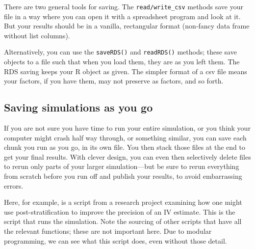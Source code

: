 \documentclass[
]{book}
\begin{document}
There are two general tools for saving. The \texttt{read/write\_csv} methods save your file in a way where you can open it with a spreadsheet program and look at it.
But your results should be in a vanilla, rectangular format (non-fancy data frame without list columns).

Alternatively, you can use the \texttt{saveRDS()} and \texttt{readRDS()} methods; these save objects to a file such that when you load them, they are as you left them.
The RDS saving keeps your R object as given.
The simpler format of a csv file means your factors, if you have them, may not preserve as factors, and so forth.

\subsection{Saving simulations as you go}\label{saving-simulations-as-you-go}

If you are not sure you have time to run your entire simulation, or you think your computer might crash half way through, or something similar, you can save each chunk you run as you go, in its own file. You then stack those files at the end to get your final results.
With clever design, you can even then selectively delete files to rerun only parts of your larger simulation---but be sure to rerun everything from scratch before you run off and publish your results, to avoid embarrassing errors.

Here, for example, is a script from a research project examining how one might use post-stratification to improve the precision of an IV estimate.
This is the script that runs the simulation.
Note the sourcing of other scripts that have all the relevant functions; these are not important here.
Due to modular programming, we can see what this script does, even without those detail.
\end{document}

